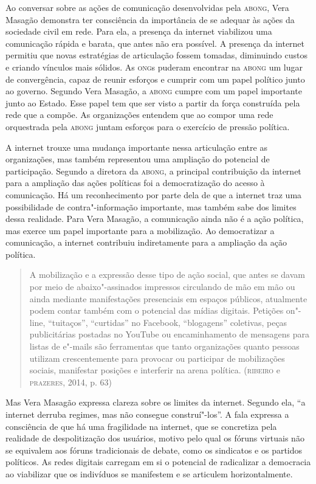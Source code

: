 Ao conversar sobre as ações de comunicação desenvolvidas pela \textsc{abong},
Vera Masagão demonstra ter consciência da importância de se adequar às
ações da sociedade civil em rede. Para ela, a presença da internet
viabilizou uma comunicação rápida e barata, que antes não era possível.
A presença da internet permitiu que novas estratégias de articulação
fossem tomadas, diminuindo custos e criando vínculos mais sólidos. As
\textsc{ong}s puderam encontrar na \textsc{abong} um lugar de convergência, capaz de
reunir esforços e cumprir com um papel político junto ao governo.
Segundo Vera Masagão, a \textsc{abong} cumpre com um papel importante junto ao
Estado. Esse papel tem que ser visto a partir da força construída pela
rede que a compõe. As organizações entendem que ao compor uma rede
orquestrada pela \textsc{abong} juntam esforços para o exercício de pressão
política.

A internet trouxe uma mudança importante nessa articulação entre as
organizações, mas também representou uma ampliação do potencial de
participação. Segundo a diretora da \textsc{abong}, a principal contribuição da
internet para a ampliação das ações políticas foi a democratização do
acesso à comunicação. Há um reconhecimento por parte dela de que a
internet traz uma possibilidade de contra"-informação importante, mas
também sabe dos limites dessa realidade. Para Vera Masagão, a
comunicação ainda não é a ação política, mas exerce um papel importante
para a mobilização. Ao democratizar a comunicação, a internet contribuiu
indiretamente para a ampliação da ação política.

\begin{quote}
A mobilização e a expressão desse tipo de ação social, que antes se
davam por meio de abaixo"-assinados impressos circulando de mão em mão ou
ainda mediante manifestações presenciais em espaços públicos, atualmente
podem contar também com o potencial das mídias digitais. Petições
on"-line, ``tuitaços'', ``curtidas'' no Facebook, ``blogagens''
coletivas, peças publicitárias postadas no YouTube ou encaminhamento de
mensagens para listas de e"-mails são ferramentas que tanto organizações
quanto pessoas utilizam crescentemente para provocar ou participar de
mobilizações sociais, manifestar posições e interferir na arena
política. (\textsc{ribeiro} e \textsc{prazeres}, 2014, p. 63)
\end{quote}

Mas Vera Masagão expressa clareza sobre os limites da internet. Segundo
ela, ``a internet derruba regimes, mas não consegue construí"-los''. A
fala expressa a consciência de que há uma fragilidade na internet, que
se concretiza pela realidade de despolitização dos usuários, motivo pelo
qual os fóruns virtuais não se equivalem aos fóruns tradicionais de
debate, como os sindicatos e os partidos políticos. As redes digitais
carregam em si o potencial de radicalizar a democracia ao viabilizar que
os indivíduos se manifestem e se articulem horizontalmente.

